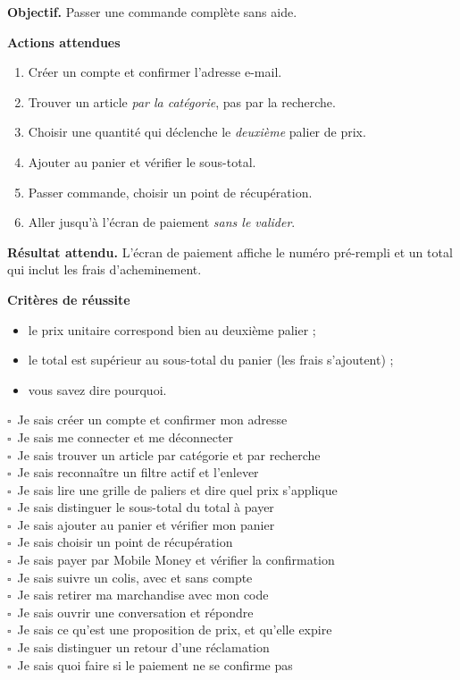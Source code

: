\documentclass[11pt,a4paper]{report}
\newcommand{\case}{$\square$~}
\begin{document}
\begin{exercice}
\textbf{Objectif.} Passer une commande complète sans aide.

\medskip
\textbf{Actions attendues}
\begin{enumerate}[leftmargin=*,itemsep=1pt,topsep=2pt]
  \item Créer un compte et confirmer l'adresse e-mail.
  \item Trouver un article \emph{par la catégorie}, pas par la recherche.
  \item Choisir une quantité qui déclenche le \emph{deuxième} palier de prix.
  \item Ajouter au panier et vérifier le sous-total.
  \item Passer commande, choisir un point de récupération.
  \item Aller jusqu'à l'écran de paiement \emph{sans le valider}.
\end{enumerate}

\medskip
\textbf{Résultat attendu.} L'écran de paiement affiche le numéro pré-rempli et
un total qui inclut les frais d'acheminement.

\medskip
\textbf{Critères de réussite}
\begin{itemize}[leftmargin=*,itemsep=1pt,topsep=2pt]
  \item le prix unitaire correspond bien au deuxième palier ;
  \item le total est supérieur au sous-total du panier (les frais s'ajoutent) ;
  \item vous savez dire pourquoi.
\end{itemize}
\end{exercice}

\begin{checklist}
\case Je sais créer un compte et confirmer mon adresse\\
\case Je sais me connecter et me déconnecter\\
\case Je sais trouver un article par catégorie et par recherche\\
\case Je sais reconnaître un filtre actif et l'enlever\\
\case Je sais lire une grille de paliers et dire quel prix s'applique\\
\case Je sais distinguer le sous-total du total à payer\\
\case Je sais ajouter au panier et vérifier mon panier\\
\case Je sais choisir un point de récupération\\
\case Je sais payer par Mobile Money et vérifier la confirmation\\
\case Je sais suivre un colis, avec et sans compte\\
\case Je sais retirer ma marchandise avec mon code\\
\case Je sais ouvrir une conversation et répondre\\
\case Je sais ce qu'est une proposition de prix, et qu'elle expire\\
\case Je sais distinguer un retour d'une réclamation\\
\case Je sais quoi faire si le paiement ne se confirme pas
\end{checklist}
\end{document}
